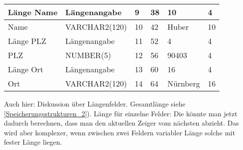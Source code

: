 \begin{enumerate}[a)]
\begin{solution}
{\begin{tabular}{p{2.8cm}lllll}
		Länge Name                & Längenangabe      & 9             & 38                    & 10                                 & 4                 \\ \hline
		Name                      & VARCHAR2(120)     & 10            & 42                    & Huber                              & 10                \\ \hline
		Länge PLZ                 & Längenangabe      & 11            & 52                    & 4                                  & 4                 \\ \hline
		PLZ                       & NUMBER(5)         & 12            & 56                    & 90403                              & 4                 \\ \hline
		Länge Ort                 & Längenangabe      & 13            & 60                    & 16                                 & 4                 \\ \hline
		Ort                       & VARCHAR2(120)     & 14            & 64                    & Nürnberg                           & 16                \\ \hline
	\end{tabular}}

	Auch hier: Diskussion über Längenfelder.
Gesamtlänge siehe \ref{Speicherungsstrukturen_2}).
Länge für einzelne Felder: Die könnte man jetzt dadurch berechnen, dass man den aktuellen Zeiger vom nächsten abzieht. Das wird aber komplexer, wenn zwischen zwei Feldern variabler Länge solche mit fester Länge liegen.
	\end{solution}

\end{enumerate}

